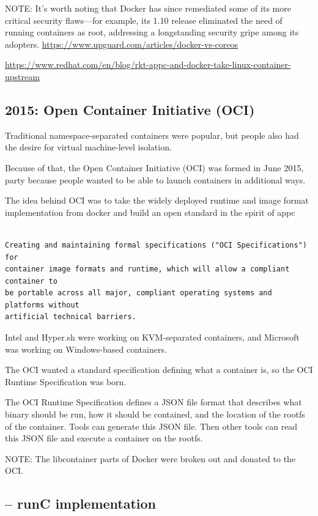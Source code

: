 NOTE: It's worth noting that Docker has since remediated some of its more
critical security flaws—for example, its 1.10 release eliminated the need of
running containers as root, addressing a longstanding security gripe among its
adopters.
\url{https://www.upguard.com/articles/docker-vs-coreos}

\url{https://www.redhat.com/en/blog/rkt-appc-and-docker-take-linux-container-upstream}

\subsection{2015: Open Container Initiative (OCI)}
\label{sec:OCI}

Traditional namespace-separated containers were popular, but people also had the
desire for virtual machine-level isolation.

Because of that, the Open Container Initiative (OCI) was formed in June 2015,
party because people wanted to be able to launch containers in additional ways.

The idea behind OCI was to take the widely deployed runtime and image format
implementation from docker and build an open standard in the spirit of appc

\begin{verbatim}

Creating and maintaining formal specifications ("OCI Specifications") for
container image formats and runtime, which will allow a compliant container to
be portable across all major, compliant operating systems and platforms without
artificial technical barriers.

\end{verbatim}

Intel and Hyper.sh were working on KVM-separated containers, and Microsoft was
working on Windows-based containers.

The OCI wanted a standard specification defining what a container is, so the OCI
Runtime Specification was born.


The OCI Runtime Specification defines a JSON file format that describes what
binary should be run, how it should be contained, and the location of the rootfs
of the container. Tools can generate this JSON file.
Then other tools can read this JSON file and execute a container on the rootfs.

NOTE: The libcontainer parts of Docker were broken out and donated to the OCI.


\subsection{-- runC implementation}


